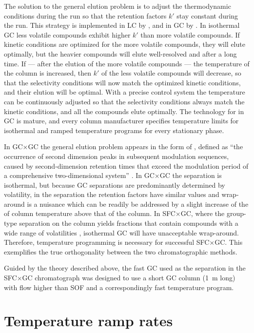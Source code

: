 The solution to the general elution problem is to adjust the thermodynamic
conditions during the run so that the retention factors \(k'\) stay constant
during the run. This strategy is implemented in LC by , and in GC by . In isothermal GC less
volatile compounds exhibit higher \(k'\) than more volatile compounds. If
kinetic conditions are optimized for the more volatile compounds, they will
elute optimally, but the heavier compounds will elute well-resolved and after a
long time. If --- after the elution of the more volatile compounds --- the
temperature of the column is increased, then \(k'\) of the less volatile
compounds will decrease, so that the selectivity conditions will now match the
optimized kinetic conditions, and their elution will be optimal. With a precise
control system the temperature can be continuously adjusted so that the
selectivity conditions always match the kinetic conditions, and all the
compounds elute optimally. The technology for 
in GC is mature, and every column manufacturer specifies temperature limits for
isothermal and ramped temperature programs for every stationary phase.

In GC×GC the general elution problem appears in the form of
, defined as ``the occurrence of second dimension peaks in
subsequent modulation sequences, caused by second-dimension retention times that
exceed the modulation period of a comprehensive two-dimensional system''
\autocite{Marriott2012}. In GC×GC the \twoD separation is isothermal, but
because GC separations are predominantly determined by volatility, in the \twoD
separation the retention factors have similar values and wrap-around is a
nuisance which can be readily be addressed by a slight increase of the of \twoD
column temperature above that of the \oneD column. In SFC×GC, where the
group-type separation on the \oneD column yields fractions that contain
compounds with a wide range of volatilities \autocite{Venter1999a}, isothermal
GC will have unacceptable wrap-around. Therefore, temperature programming is
necessary for successful SFC×GC. This exemplifies the true orthogonality between
the two chromatographic methods.

Guided by the theory described above, the fast GC used as the \twoD  separation
in the SFC×GC chromatograph was designed to use a short GC column
(\SI{1}{\metre} long) with flow higher than SOF and a correspondingly
fast temperature program.

\section{Temperature ramp rates}
\label{sec:RampRates}

